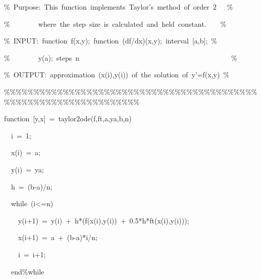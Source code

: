 \begin{description}
\begin{lyxcode}
\%~Purpose:~This~function~implements~Taylor's~method~of~order~2~~~\%

\%~~~~~~~~where~the~step~size~is~calculated~and~held~constant.~~~~\%

\%~INPUT:~function~f(x,y);~function~(df/dx)(x,y);~interval~{[}a,b{]};~\%

\%~~~~~~~~y(a);~steps~n~~~~~~~~~~~~~~~~~~~~~~~~~~~~~~~~~~~~~~~~~~~\%

\%~OUTPUT:~approximation~(x(i),y(i))~of~the~solution~of~y'=f(x,y)~\%

\%\%\%\%\%\%\%\%\%\%\%\%\%\%\%\%\%\%\%\%\%\%\%\%\%\%\%\%\%\%\%\%\%\%\%\%\%\%\%\%\%\%\%\%\%\%\%\%\%\%\%\%\%\%\%\%\%\%\%\%\%\%\%\%\%\%

function~{[}y,x{]}~=~taylor2ode(f,ft,a,ya,b,n)

~~i~=~1;

~~x(i)~=~a;

~~y(i)~=~ya;

~~h~=~(b-a)/n;

~~while~(i<=n)

~~~~y(i+1)~=~y(i)~+~h{*}(f(x(i),y(i))~+~0.5{*}h{*}ft(x(i),y(i)));

~~~~x(i+1)~=~a~+~(b-a){*}i/n;

~~~~i~=~i+1;

~~end\%while


\end{lyxcode}
\end{description}

